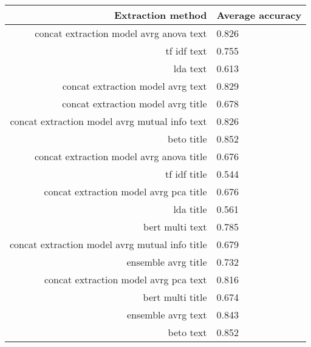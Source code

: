 \begin{tabular}{|r|l|}
  \hline
  Extraction method & Average accuracy \\ 
  \hline
  concat extraction model avrg anova text & 0.826 \\ 
  \hline
  tf idf text & 0.755 \\ 
  \hline
  lda text & 0.613 \\ 
  \hline
  concat extraction model avrg text & 0.829 \\ 
  \hline
  concat extraction model avrg title & 0.678 \\ 
  \hline
  concat extraction model avrg mutual info text & 0.826 \\ 
  \hline
  beto title & 0.852 \\ 
  \hline
  concat extraction model avrg anova title & 0.676 \\ 
  \hline
  tf idf title & 0.544 \\ 
  \hline
  concat extraction model avrg pca title & 0.676 \\ 
  \hline
  lda title & 0.561 \\ 
  \hline
  bert multi text & 0.785 \\ 
  \hline
  concat extraction model avrg mutual info title & 0.679 \\ 
  \hline
  ensemble avrg title & 0.732 \\ 
  \hline
  concat extraction model avrg pca text & 0.816 \\ 
  \hline
  bert multi title & 0.674 \\ 
  \hline
  ensemble avrg text & 0.843 \\ 
  \hline
  beto text & 0.852 \\ 
  \hline
\end{tabular}
